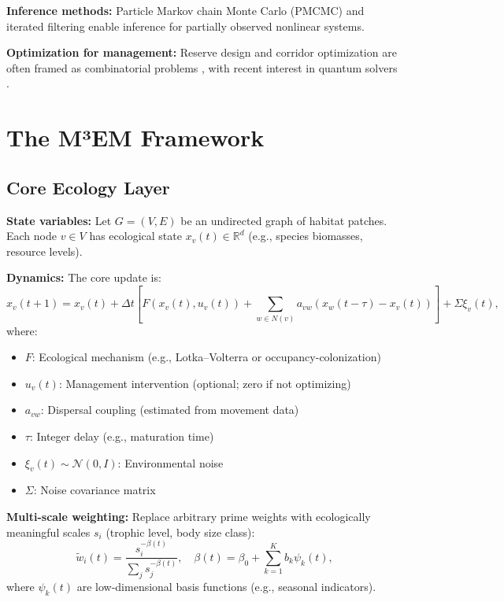 \documentclass[12pt]{article}
\begin{document}
\textbf{Inference methods:} Particle Markov chain Monte Carlo (PMCMC) \citep{Andrieu2010} and iterated filtering \citep{Ionides2015} enable inference for partially observed nonlinear systems.

\textbf{Optimization for management:} Reserve design and corridor optimization are often framed as combinatorial problems \citep{Williams2004}, with recent interest in quantum solvers \citep{Farhi2014}.

\section{The M³EM Framework}
\label{sec:framework}

\subsection{Core Ecology Layer}
\label{subsec:core}

\textbf{State variables:} Let $G=(V,E)$ be an undirected graph of habitat patches. Each node $v\in V$ has ecological state $x_v(t)\in\mathbb{R}^d$ (e.g., species biomasses, resource levels).

\textbf{Dynamics:} The core update is:
\begin{equation}
\label{eq:core}
x_v(t+1) = x_v(t) + \Delta t \left[ F(x_v(t), u_v(t)) + \sum_{w \in N(v)} a_{vw} (x_w(t-\tau) - x_v(t)) \right] + \Sigma \xi_v(t),
\end{equation}
where:
\begin{itemize}
    \item $F$: Ecological mechanism (e.g., Lotka–Volterra or occupancy-colonization)
    \item $u_v(t)$: Management intervention (optional; zero if not optimizing)
    \item $a_{vw}$: Dispersal coupling (estimated from movement data)
    \item $\tau$: Integer delay (e.g., maturation time)
    \item $\xi_v(t)\sim\mathcal{N}(0,I)$: Environmental noise
    \item $\Sigma$: Noise covariance matrix
\end{itemize}

\textbf{Multi-scale weighting:} Replace arbitrary prime weights with ecologically meaningful scales $s_i$ (trophic level, body size class):
\begin{equation}
\label{eq:weights}
\tilde w_i(t) = \frac{s_i^{-\beta(t)}}{\sum_j s_j^{-\beta(t)}}, \quad \beta(t) = \beta_0 + \sum_{k=1}^K b_k \psi_k(t),
\end{equation}
where $\psi_k(t)$ are low-dimensional basis functions (e.g., seasonal indicators).
\end{document}

